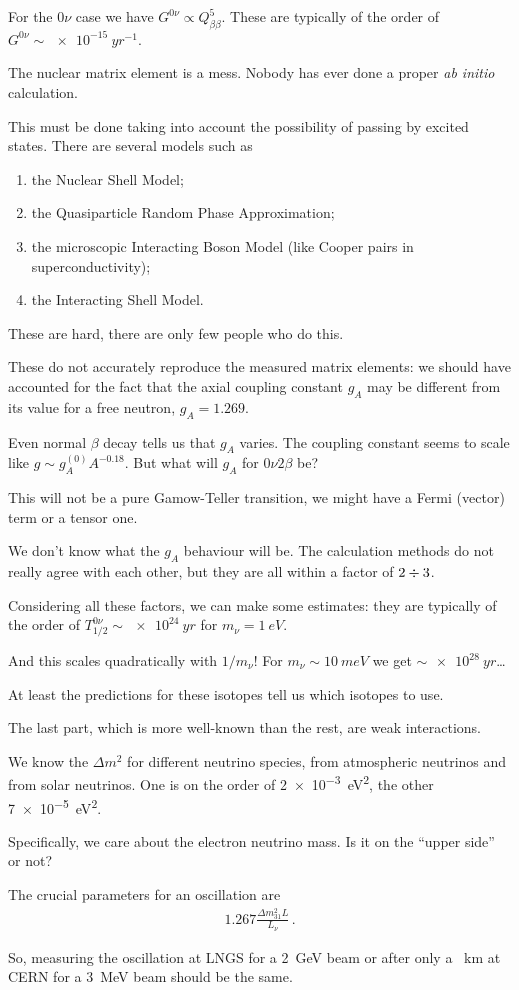 \documentclass[main.tex]{subfiles}
\begin{document}
For the \(0 \nu \) case we have \(G^{0 \nu } \propto Q^{5}_{\beta \beta }\). 
These are typically of the order of \(G^{0 \nu } \sim \SI{e-15}{yr^{-1}}\). 

The nuclear matrix element is a mess.
Nobody has ever done a proper \emph{ab initio} calculation.

This must be done taking into account the possibility of passing by excited states. 
There are several models such as 
\begin{enumerate}
    \item the Nuclear Shell Model;
    \item the Quasiparticle Random Phase Approximation;
    \item the microscopic Interacting Boson Model (like Cooper pairs in superconductivity);
    \item the Interacting Shell Model. 
\end{enumerate}

These are hard, there are only few people who do this. 

These do not accurately reproduce the measured matrix elements: 
we should have accounted for the fact that the 
axial coupling constant \(g_A\) may be different from its value 
for a free neutron, \(g_A = 1.269\). 

Even normal \(\beta \) decay tells us that \(g_A\) varies. 
The coupling constant seems to scale like \(g \sim g_A^{(0)} A^{-0.18}\). 
But what will \(g_A\) for \(0 \nu 2 \beta \) be? 

This will not be a pure Gamow-Teller transition, we might have a Fermi (vector) 
term or a tensor one. 

We don't know what the \(g_A\) behaviour will be. 
The calculation methods do not really agree with each other, but they
are all within a factor of \(2 \divisionsymbol 3\). 

Considering all these factors, we can make some estimates: they are typically 
of the order of \(T_{1/2}^{0 \nu } \sim \SI{e24}{yr}\) for \(m_\nu = \SI{1}{eV}\). 

And this scales quadratically with \(1 / m_\nu \)! For \(m_\nu \sim \SI{10}{meV}\) we get \(\sim \SI{e28}{yr}\)\dots

At least the predictions for these isotopes tell us which isotopes to use. 

The last part, which is more well-known than the rest, are weak interactions. 

We know the \(\Delta m^2\) for different neutrino species, 
from atmospheric neutrinos and from solar neutrinos. 
One is on the order of \SI{2e-3}{eV^2}, the other \SI{7e-5}{eV^2}. 

Specifically, we care about the electron neutrino mass. Is it on the ``upper side'' 
or not? 

The crucial parameters for an oscillation are 
%
\begin{align}
1.267 \frac{\Delta m_{31}^2 L}{L_\nu }
\,.
\end{align}

So, measuring the oscillation at LNGS for a \SI{2}{GeV} beam 
or after only a \SI{}{km} at CERN for a \SI{3}{MeV} beam should be the same. 
\end{document}
